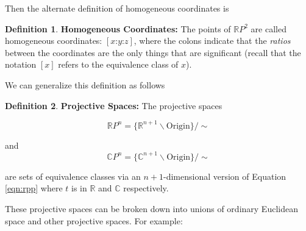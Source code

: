 \documentclass{article}
\theoremstyle{definition}
\newtheorem{definition}{Definition}[section]
\begin{document}
\bigskip
\noindent
Then the alternate definition of  homogeneous coordinates is

\begin{definition} {\bf Homogeneous Coordinates:}
The points of $\mathbb{R}P^2$ are called homogeneous coordinates: $[x \mathord{:} y \mathord{:} z]$, where the colons indicate that the \emph{ratios}
between the coordinates are the only things that are significant (recall that the notation $[x]$ refers to the equivalence class of $x$).
\end{definition}

\bigskip
\noindent
We can generalize this definition as follows

\begin{definition} {\bf Projective Spaces:} The projective spaces 

\begin{equation*}
\mathbb{R}P^n = \{\mathbb{R}^{n+1} \backslash \text{Origin}\} / \sim 
\end{equation*}

and
\begin{equation*}
\mathbb{C}P^n = \{\mathbb{C}^{n+1} \backslash \text{Origin}\} / \sim 
\end{equation*}

\bigskip
\noindent
are sets of equivalence classes via an $n + 1$-dimensional version of
Equation \ref{eqn:rpp} where $t$ is in $\mathbb{R}$ and $\mathbb{C}$ 
respectively.
\end{definition}

\bigskip
\noindent
These projective spaces can be broken down into unions of ordinary Euclidean space and other projective spaces. For example:
\end{document}
